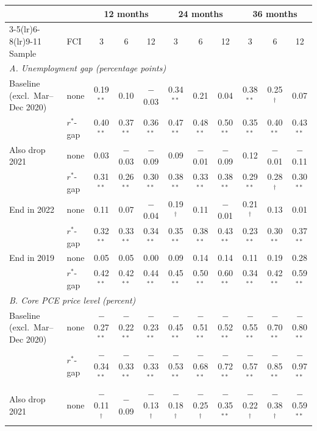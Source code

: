 \begin{tabular}{llccccccccc}
\toprule
 & & \multicolumn{3}{c}{12 months} & \multicolumn{3}{c}{24 months} & \multicolumn{3}{c}{36 months}\\
\cmidrule(lr){3-5}\cmidrule(lr){6-8}\cmidrule(lr){9-11}
Sample & FCI & 3 & 6 & 12 & 3 & 6 & 12 & 3 & 6 & 12 \\
\midrule
\multicolumn{11}{l}{\textit{A. Unemployment gap (percentage points)}}\\
Baseline (excl.\ Mar--Dec 2020) & none & 0.19$^{**}$ & 0.10 & $-$0.03 & 0.34$^{**}$ & 0.21 & 0.04 & 0.38$^{**}$ & 0.25$^{\dagger}$ & 0.07 \\
 & $r^*$-gap & 0.40$^{**}$ & 0.37$^{**}$ & 0.36$^{**}$ & 0.47$^{**}$ & 0.48$^{**}$ & 0.50$^{**}$ & 0.35$^{**}$ & 0.40$^{**}$ & 0.43$^{**}$ \\
Also drop 2021 & none & 0.03 & $-$0.03 & $-$0.09 & 0.09 & $-$0.01 & $-$0.09 & 0.12 & $-$0.01 & $-$0.11 \\
 & $r^*$-gap & 0.31$^{**}$ & 0.26$^{**}$ & 0.30$^{**}$ & 0.38$^{**}$ & 0.33$^{**}$ & 0.38$^{**}$ & 0.29$^{**}$ & 0.28$^{\dagger}$ & 0.30$^{**}$ \\
End in 2022 & none & 0.11 & 0.07 & $-$0.04 & 0.19$^{\dagger}$ & 0.11 & $-$0.01 & 0.21$^{\dagger}$ & 0.13 & 0.01 \\
 & $r^*$-gap & 0.32$^{**}$ & 0.33$^{**}$ & 0.34$^{**}$ & 0.35$^{**}$ & 0.38$^{**}$ & 0.43$^{**}$ & 0.23$^{**}$ & 0.30$^{**}$ & 0.37$^{**}$ \\
End in 2019 & none & 0.05 & 0.05 & 0.00 & 0.09 & 0.14 & 0.14 & 0.11 & 0.19 & 0.28 \\
 & $r^*$-gap & 0.42$^{**}$ & 0.42$^{**}$ & 0.44$^{**}$ & 0.45$^{**}$ & 0.50$^{**}$ & 0.60$^{**}$ & 0.34$^{**}$ & 0.42$^{**}$ & 0.59$^{**}$ \\
\midrule
\multicolumn{11}{l}{\textit{B. Core PCE price level (percent)}}\\
Baseline (excl.\ Mar--Dec 2020) & none & $-$0.27$^{**}$ & $-$0.22$^{**}$ & $-$0.23$^{**}$ & $-$0.45$^{**}$ & $-$0.51$^{**}$ & $-$0.52$^{**}$ & $-$0.55$^{**}$ & $-$0.70$^{**}$ & $-$0.80$^{**}$ \\
 & $r^*$-gap & $-$0.34$^{**}$ & $-$0.33$^{**}$ & $-$0.33$^{**}$ & $-$0.53$^{**}$ & $-$0.68$^{**}$ & $-$0.72$^{**}$ & $-$0.57$^{**}$ & $-$0.85$^{**}$ & $-$0.97$^{**}$ \\
Also drop 2021 & none & $-$0.11$^{\dagger}$ & $-$0.09 & $-$0.13$^{\dagger}$ & $-$0.18$^{\dagger}$ & $-$0.25$^{\dagger}$ & $-$0.35$^{**}$ & $-$0.22$^{\dagger}$ & $-$0.38$^{\dagger}$ & $-$0.59$^{**}$ \\

\end{tabular}
